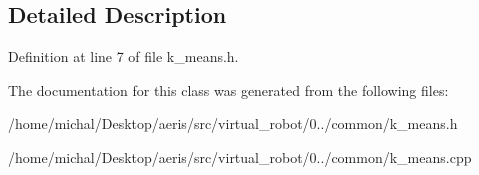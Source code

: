 \subsection{Detailed Description}


Definition at line 7 of file k\-\_\-means.\-h.



The documentation for this class was generated from the following files\-:\begin{DoxyCompactItemize}
\item 
/home/michal/\-Desktop/aeris/src/virtual\-\_\-robot/0../common/k\-\_\-means.\-h\item 
/home/michal/\-Desktop/aeris/src/virtual\-\_\-robot/0../common/k\-\_\-means.\-cpp\end{DoxyCompactItemize}
